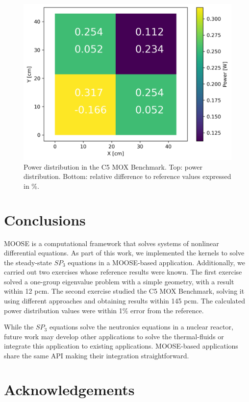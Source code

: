 \documentclass{anstrans}
\begin{document}
\begin{figure}[htbp!] %
    \centering
    \includegraphics[width=0.95\linewidth]{figures/distrib.png}
    \hfill
    \caption{Power distribution in the C5 MOX Benchmark. Top: power distribution. Bottom: relative difference to reference values expressed in \%.}
    \label{fig:power-distrib}
\end{figure}


\section{Conclusions}

MOOSE is a computational framework that solves systems of nonlinear differential equations.
As part of this work, we implemented the kernels to solve the steady-state $SP_3$ equations in a MOOSE-based application.
Additionally, we carried out two exercises whose reference results were known.
The first exercise solved a one-group eigenvalue problem with a simple geometry, with a result within 12 pcm.
The second exercise studied the C5 MOX Benchmark, solving it using different approaches and obtaining results within 145 pcm.
The calculated power distribution values were within 1\% error from the reference.

While the $SP_3$ equations solve the neutronics equations in a nuclear reactor, future work may develop other applications to solve the thermal-fluids or integrate this application to existing applications.
MOOSE-based applications share the same API making their integration straightforward.


\section{Acknowledgements}
\end{document}
